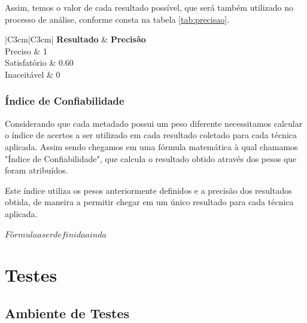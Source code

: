 \documentclass[
	12pt,               %
	openright,          %
	twoside,            %
	a4paper,            %
	english,            %
	brazil              %
	]{abntex2}
\begin{document}
Assim, temos o valor de cada resultado possível, que será também utilizado no processo de análise, conforme consta na tabela \ref{tab:precisao}.


\begin{table}
    \caption{Resultados obtidos em cada metadado e sua precisão}
    \begin{center}
    	\begin{tabular}{|C{3cm}|C{3cm}|}
			\hline \textbf{Resultado} & \textbf{Precisão} \\ 
			\hline Preciso & 1\\
	    	\hline Satisfatório & 0.60 \\
	    	\hline Inaceitável & 0 \\
	    	\hline 
    	\end{tabular} 
    \end{center}
  	\label{tab:precisao}
\end{table}

\subsection{Índice de Confiabilidade}


Considerando que cada metadado possui um peso diferente necessitamos calcular o índice de acertos a ser utilizado em cada resultado coletado para cada técnica aplicada. Assim sendo chegamos em uma fórmula matemática à qual chamamos "Índice de Confiabilidade", que calcula o resultado obtido através dos pesos que foram atribuídos.

Este índice utiliza os pesos anteriormente definidos e a precisão dos resultados obtida, de maneira a permitir chegar em um único resultado para cada técnica aplicada.

\begin{center}
	$ Fórmula a ser definida ainda $
\end{center}


\chapter{Testes}

\section{Ambiente de Testes}
\end{document}
